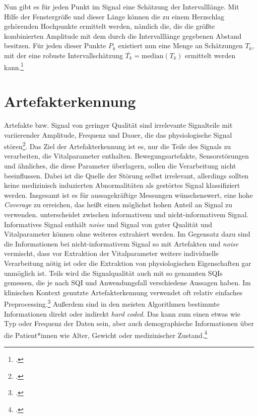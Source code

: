 	Nun gibt es für jeden Punkt im Signal eine Schätzung der Intervalllänge. Mit Hilfe der Fenstergröße und dieser Länge können die zu einem Herzschlag gehörenden Hochpunkte ermittelt werden, nämlich die, die die größte kombinierten Amplitude mit dem durch die Intervalllänge gegebenen Abstand besitzen. Für jeden dieser Punkte $P_k$ existiert nun eine Menge an Schätzungen $T_k$, mit der eine robuste Intervallschätzung $\overline{T_k} = \text{median}(T_k)$ ermittelt werden kann.\footcites[Vgl. zu diesem Kapitel][]{Bruser2013}

\section{Artefakterkennung}\label{artefakterkennung}
	
	Artefakte bzw. Signal von geringer Qualität sind irrelevante Signalteile mit variierender Amplitude, Frequenz und Dauer, die das physiologische Signal stören\footcite[Vgl.][]{Nizami2013}. Das Ziel der Artefakterkennung ist es, nur die Teile des Signals zu verarbeiten, die Vitalparameter enthalten. Bewegungsartefakte, Sensorstörungen und ähnliches, die diese Parameter überlagern, sollen die Verarbeitung nicht beeinflussen. Dabei ist die Quelle der Störung selbst irrelevant, allerdings sollten keine medizinisch induzierten Abnormalitäten als gestörtes Signal klassifiziert werden. Insgesamt ist es für aussagekräftige Messungen wünschenswert, eine hohe \textit{Coverage} zu erreichen, das heißt einen möglichst hohen Anteil an Signal zu verwenden. \citeauthor{Sadek2016} unterscheidet zwischen informativem und nicht-informativem Signal. Informatives Signal enthält \textit{noise} und Signal von guter Qualität und Vitalparameter können ohne weiteres extrahiert werden. Im Gegensatz dazu sind die Informationen bei nicht-informativem Signal so mit Artefakten und \textit{noise} vermischt, dass vor Extraktion der Vitalparameter weitere individuelle Verarbeitung nötig ist oder die Extraktion von physiologischen Eigenschaften gar unmöglich ist. Teils wird die Signalqualität auch mit so genannten \acp{SQI} gemessen, die je nach \ac{SQI} und Anwendungsfall verschiedene Aussagen haben. Im klinischen Kontext genutzte Artefakterkennung verwendet oft relativ einfaches Preprocessing.\footcite[Vgl.][]{Nizami2013} Außerdem sind in den meisten Algorithmen bestimmte Informationen direkt oder indirekt \textit{hard coded}. Das kann zum einen etwas wie Typ oder Frequenz der Daten sein, aber auch demographische Informationen über die Patient*innen wie Alter, Gewicht oder medizinischer Zustand.\footcite[Vgl.][]{Nizami2013}
		
